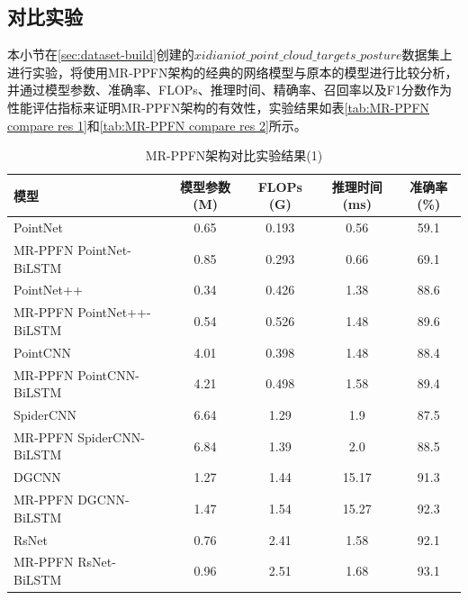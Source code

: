 \subsection{对比实验}
本小节在\eqref{sec:dataset-build}创建的$xidianiot\_point\_cloud\_targets\_posture$数据集上进行实验，将使用MR-PPFN架构的经典的网络模型与原本的模型进行比较分析，并通过模型参数、准确率、FLOPs、推理时间、精确率、召回率以及F1分数作为性能评估指标来证明MR-PPFN架构的有效性，实验结果如表\eqref{tab:MR-PPFN compare res 1}和\eqref{tab:MR-PPFN compare res 2}所示。
\begin{table}[htbp]
    \centering
    \caption{MR-PPFN架构对比实验结果(1)}
    \label{tab:MR-PPFN compare res 1}
    \begin{tabular}{lcccc}
        \toprule
        \textbf{模型} & \textbf{模型参数 (M)} & \textbf{FLOPs (G)} & \textbf{推理时间 (ms)} & \textbf{准确率 (\%)} \\
        \midrule
        PointNet & 0.65 & 0.193 & 0.56 & 59.1 \\
        MR-PPFN PointNet-BiLSTM & 0.85 & 0.293 & 0.66 & 69.1 \\
        PointNet++ & 0.34 & 0.426 & 1.38 & 88.6 \\
        MR-PPFN PointNet++-BiLSTM & 0.54 & 0.526 & 1.48 & 89.6 \\
        PointCNN & 4.01 & 0.398 & 1.48 & 88.4 \\
        MR-PPFN PointCNN-BiLSTM & 4.21 & 0.498 & 1.58 & 89.4 \\
        SpiderCNN & 6.64 & 1.29 & 1.9 & 87.5 \\
        MR-PPFN SpiderCNN-BiLSTM & 6.84 & 1.39 & 2.0 & 88.5 \\
        DGCNN & 1.27 & 1.44 & 15.17 & 91.3 \\
        MR-PPFN DGCNN-BiLSTM & 1.47 & 1.54 & 15.27 & 92.3 \\
        RsNet & 0.76 & 2.41 & 1.58 & 92.1 \\
        MR-PPFN RsNet-BiLSTM & 0.96 & 2.51 & 1.68 & 93.1 \\
        \bottomrule
    \end{tabular}
\end{table}

